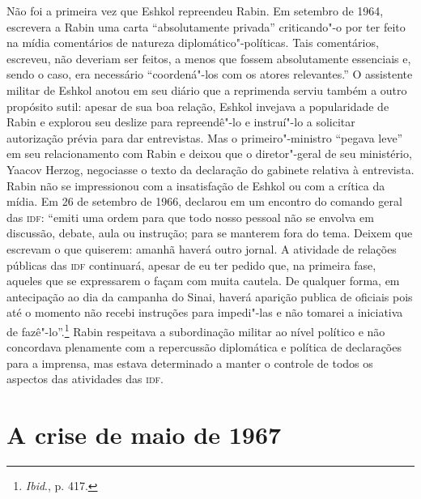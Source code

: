 Não foi a primeira vez que Eshkol repreendeu Rabin. Em setembro de 1964,
escrevera a Rabin uma carta ``absolutamente privada'' criticando"-o
por ter feito na mídia comentários de natureza diplomático"-políticas.
Tais comentários, escreveu, não deveriam ser feitos, a menos que fossem
absolutamente essenciais e, sendo o caso, era necessário ``coordená"-los
com os atores relevantes.'' O assistente militar de Eshkol anotou em seu
diário que a reprimenda serviu também a outro propósito sutil: apesar de
sua boa relação, Eshkol invejava a popularidade de Rabin e explorou seu
deslize para repreendê"-lo e instruí"-lo a solicitar autorização prévia
para dar entrevistas. Mas o primeiro"-ministro ``pegava leve'' em seu
relacionamento com Rabin e deixou que o diretor"-geral de seu ministério,
Yaacov Herzog, negociasse o texto da declaração do gabinete relativa à
entrevista. Rabin não se impressionou com a insatisfação de
Eshkol ou com a crítica da mídia. Em 26 de setembro de 1966, declarou em um
encontro do comando geral das \textsc{idf}: ``emiti uma ordem para que todo nosso
pessoal não se envolva em discussão, debate, aula ou instrução; para se
manterem fora do tema. Deixem que escrevam o que quiserem: amanhã haverá
outro jornal. A atividade de relações públicas das \textsc{idf} continuará,
apesar de eu ter pedido que, na primeira fase, aqueles que se
expressarem o façam com muita cautela. De qualquer forma, em antecipação
ao dia da campanha do Sinai, haverá aparição publica de oficiais pois
até o momento não recebi instruções para impedi"-las e não tomarei a
iniciativa de fazê"-lo''.\footnote{\emph{Ibid}., p. 417.} Rabin respeitava a subordinação
militar ao nível político e não concordava plenamente com a repercussão
diplomática e política de declarações para a imprensa, mas estava
determinado a manter o controle de todos os aspectos das atividades das
\textsc{idf}.

\section{A crise de maio de 1967}

